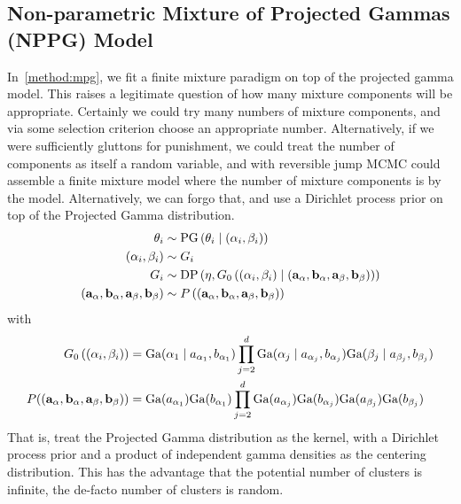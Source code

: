 \subsection{Non-parametric Mixture of Projected Gammas (NPPG) Model}
\label{method:nppg}
In~\ref{method:mpg}, we fit a finite mixture paradigm on top of the projected
gamma model.  This raises a legitimate question of how many mixture components
will be appropriate.  Certainly we could try many numbers of mixture components,
and via some selection criterion choose an appropriate number.  Alternatively, if
we were sufficiently gluttons for punishment, we could treat the number of
components as itself a random variable, and with reversible jump MCMC could
assemble a finite mixture model where the number of mixture components is
by the model.  Alternatively, we can forgo that, and use a Dirichlet process
prior on top of the Projected Gamma distribution.
\begin{equation}
  \label{eqn:nppg}
  \begin{aligned}
    \theta_i &\sim \text{PG}\left(\theta_i\mid ({\bf \alpha}_i, {\bf \beta}_i) \right)\\
    ({\bf \alpha}_i, {\bf \beta}_i) &\sim G_i\\
    G_i &\sim \text{DP}\left(\eta, G_0\left(({\bf \alpha}_i, {\bf \beta}_i)\mid ({\bf a}_{\alpha}, {\bf b}_{\alpha}, {\bf a}_{\beta}, {\bf b}_{\beta}) \right)\right)\\
     ({\bf a}_{\alpha}, {\bf b}_{\alpha}, {\bf a}_{\beta}, {\bf b}_{\beta}) &\sim P\left(({\bf a}_{\alpha}, {\bf b}_{\alpha}, {\bf a}_{\beta}, {\bf b}_{\beta})\right)
  \end{aligned}
\end{equation}
with
\begin{equation*}
    \begin{aligned}
    G_0\left(({\bf \alpha}_i, {\bf \beta}_i)\right) &= \text{Ga}(\alpha_1\mid a_{\alpha_1},b_{\alpha_1})\prod_{j = 2}^d\text{Ga}(\alpha_j\mid a_{\alpha_j}, b_{\alpha_j})\text{Ga}(\beta_j\mid a_{\beta_j}, b_{\beta_j})\\
    P(({\bf a}_{\alpha}, {\bf b}_{\alpha}, {\bf a}_{\beta}, {\bf b}_{\beta})) &= \text{Ga}(a_{\alpha_1})\text{Ga}(b_{\alpha_1})\prod_{j = 2}^d\text{Ga}(a_{\alpha_j})\text{Ga}(b_{\alpha_j})\text{Ga}(a_{\beta_j})\text{Ga}(b_{\beta_j})
    \end{aligned}
\end{equation*}
That is, treat the Projected Gamma distribution as the kernel, with a
  Dirichlet process prior and a product of independent gamma densities as the
  centering distribution.  This has the advantage that the potential number of
  clusters is infinite, the de-facto number of clusters is random.

